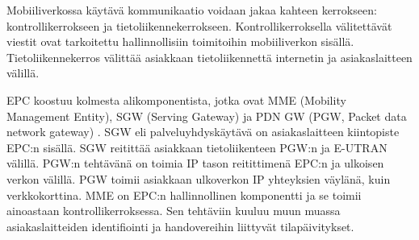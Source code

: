 Mobiiliverkossa käytävä kommunikaatio voidaan jakaa kahteen kerrokseen: kontrollikerrokseen ja tietoliikennekerrokseen.
Kontrollikerroksella välitettävät viestit ovat tarkoitettu hallinnollisiin toimitoihin mobiiliverkon sisällä. 
Tietoliikennekerros välittää asiakkaan tietoliikennettä internetin ja asiakaslaitteen välillä.

EPC koostuu kolmesta alikomponentista, jotka ovat MME (Mobility Management Entity), SGW (Serving Gateway) ja PDN GW (PGW, Packet data network gateway) \cite{etsilte}.
SGW eli palveluyhdyskäytävä on asiakaslaitteen kiintopiste EPC:n sisällä.
SGW reitittää asiakkaan tietoliikenteen PGW:n ja E-UTRAN välillä. 
PGW:n tehtävänä on toimia IP tason reitittimenä EPC:n ja ulkoisen verkon välillä. 
PGW toimii asiakkaan ulkoverkon IP yhteyksien väylänä, kuin verkkokorttina. 
MME on EPC:n hallinnollinen komponentti ja se toimii ainoastaan kontrollikerroksessa. Sen tehtäviin kuuluu muun muassa asiakaslaitteiden identifiointi ja handovereihin liittyvät tilapäivitykset.
\cite{3gppepc}